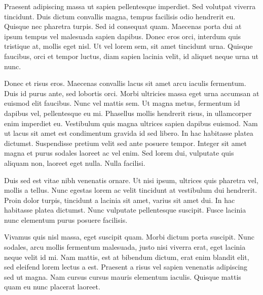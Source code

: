 \documentclass[12pt]{report}
\begin{document}
Praesent adipiscing massa ut sapien pellentesque imperdiet. Sed volutpat viverra tincidunt. Duis dictum convallis magna, tempus facilisis odio hendrerit eu. Quisque nec pharetra turpis. Sed id consequat quam. Maecenas porta dui at ipsum tempus vel malesuada sapien dapibus. Donec eros orci, interdum quis tristique at, mollis eget nisl. Ut vel lorem sem, sit amet tincidunt urna. Quisque faucibus, orci et tempor luctus, diam sapien lacinia velit, id aliquet neque urna ut nunc.

Donec et risus eros. Maecenas convallis lacus sit amet arcu iaculis fermentum. Duis id purus ante, sed lobortis orci. Morbi ultricies massa eget urna accumsan at euismod elit faucibus. Nunc vel mattis sem. Ut magna metus, fermentum id dapibus vel, pellentesque eu mi. Phasellus mollis hendrerit risus, in ullamcorper enim imperdiet eu. Vestibulum quis magna ultrices sapien dapibus euismod. Nam ut lacus sit amet est condimentum gravida id sed libero. In hac habitasse platea dictumst. Suspendisse pretium velit sed ante posuere tempor. Integer sit amet magna et purus sodales laoreet ac vel enim. Sed lorem dui, vulputate quis aliquam non, laoreet eget nulla. Nulla facilisi.

Duis sed est vitae nibh venenatis ornare. Ut nisi ipsum, ultrices quis pharetra vel, mollis a tellus. Nunc egestas lorem ac velit tincidunt at vestibulum dui hendrerit. Proin dolor turpis, tincidunt a lacinia sit amet, varius sit amet dui. In hac habitasse platea dictumst. Nunc vulputate pellentesque suscipit. Fusce lacinia nunc elementum purus posuere facilisis.

Vivamus quis nisl massa, eget suscipit quam. Morbi dictum porta suscipit. Nunc sodales, arcu mollis fermentum malesuada, justo nisi viverra erat, eget lacinia neque velit id mi. Nam mattis, est at bibendum dictum, erat enim blandit elit, sed eleifend lorem lectus a est. Praesent a risus vel sapien venenatis adipiscing sed ut magna. Nam cursus cursus mauris elementum iaculis. Quisque mattis quam eu nunc placerat laoreet.






% 
\end{document}
